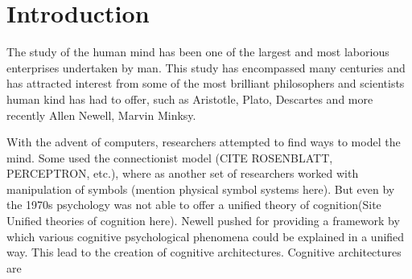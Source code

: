 \chapter{Introduction}
\label{chap-one}



The study of the human mind has been one of the largest and most
laborious enterprises undertaken by man. This study has encompassed many
centuries and has attracted interest from some of the most brilliant
philosophers and scientists human kind has had to offer, such as
Aristotle, Plato, Descartes and more recently Allen Newell, Marvin
Minksy. 

With the advent of computers, researchers attempted to find ways to
model the mind. Some used the connectionist model (CITE ROSENBLATT,
PERCEPTRON, etc.), where as another set of researchers worked with
manipulation of symbols (mention physical symbol systems here).
But even by the 1970s psychology was not able to offer a unified
theory of cognition(Site Unified theories of cognition here). Newell
pushed for providing a framework by which various cognitive
psychological phenomena could be explained in a unified way. This lead
to the creation of cognitive architectures. Cognitive architectures
are 



